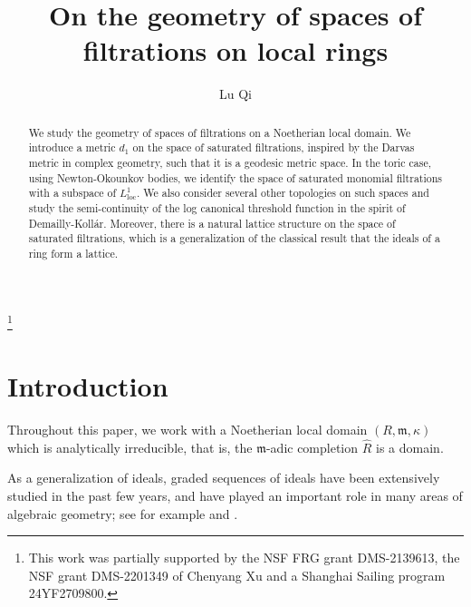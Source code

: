 \documentclass[11pt, leqno]{amsart}%
\theoremstyle{plain}
\theoremstyle{definition}
\theoremstyle{remark}
\newcommand{\fm}{\mathfrak{m}}
\newcommand{\loc}{\mathrm{loc}}
\numberwithin{equation}{section}
\begin{document}
	
    \title{On the geometry of spaces of filtrations on local rings}
	
	
	
    \author{Lu Qi}\footnote{This work was partially supported by the NSF FRG grant DMS-2139613, the NSF grant DMS-2201349 of Chenyang Xu and a Shanghai Sailing program 24YF2709800.}
    \address{School of Mathematical Sciences, East China Normal University, Shanghai 200241, China}
    
    \address{Department of Mathematics, Princeton University, Princeton, NJ 08544, USA.}
    
	
    \begin{abstract}
        We study the geometry of spaces of filtrations on a Noetherian local domain. We introduce a metric $d_1$ on the space of saturated filtrations, inspired by the Darvas metric in complex geometry, such that it is a geodesic metric space. In the toric case, using Newton-Okounkov bodies, we identify the space of saturated monomial filtrations with a subspace of $L^1_\loc$.
        We also consider several other topologies on such spaces and study the semi-continuity of the log canonical threshold function in the spirit of Demailly-Koll\'ar.
        Moreover, there is a natural lattice structure on the space of saturated filtrations, which is a generalization of the classical result that the ideals of a ring form a lattice.
    \end{abstract}
	
	
    \maketitle
	
    \setcounter{tocdepth}{1}
    \tableofcontents
	
	
	
	
\section{Introduction}
	
	
	
	
    Throughout this paper, we work with a Noetherian local domain $(R,\fm,\kappa)$ which is analytically irreducible, that is, the $\fm$-adic completion $\hat{R}$ is a domain. 

    As a generalization of ideals, graded sequences of ideals have been extensively studied in the past few years, and have played an important role in many areas of algebraic geometry; see for example \cites{ELS03,JM12,Cut13} and \cites{BFJ08,BdFF12,BFJ14,Li18,Blu18,Liu18,Xu20,XZ20b,LXZ22}.
    
\end{document}
